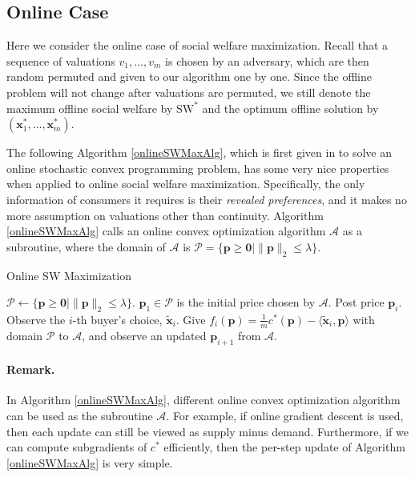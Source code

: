 \documentclass{article}
\begin{document}
\subsection{Online Case}\label{onlineSec}
Here we consider the online case of social welfare maximization. Recall that a sequence of valuations $v_1,\ldots,v_m$ is chosen by an adversary, which are then random permuted and given to our algorithm one by one. Since the offline problem will not change after valuations are permuted, we still denote the maximum offline social welfare by $\mathrm{SW}^*$ and the optimum offline solution by $(\mathbf{x}_1^*,\ldots,\mathbf{x}_m^*)$.

The following Algorithm \ref{onlineSWMaxAlg}, which is first given in \cite{AD15} to solve an online stochastic convex programming problem, has some very nice properties when applied to online social welfare maximization. Specifically, the only information of consumers it requires is their \emph{revealed preferences}, and it makes no more assumption on valuations other than continuity. Algorithm \ref{onlineSWMaxAlg} calls an online convex optimization algorithm $\mathcal{A}$ as a subroutine, where the domain of $\mathcal{A}$ is $\mathcal{P}=\{\mathbf{p}\ge \mathbf{0}|\|\mathbf{p}\|_2\le\lambda\}$.
\begin{algorithm}
    \caption{Online SW Maximization}
    \begin{algorithmic}
        \STATE $\mathcal{P}\leftarrow\{\mathbf{p}\ge \mathbf{0}|\|\mathbf{p}\|_2\le\lambda\}$.
        \STATE $\mathbf{p}_1\in \mathcal{P}$ is the initial price chosen by $\mathcal{A}$.
        \STATE Post price $\mathbf{p}_i$.
        \STATE Observe the $i$-th buyer's choice, $\tilde{\mathbf{x}}_i$.
        \STATE Give $f_i(\mathbf{p})=\frac{1}{m}c^*(\mathbf{p})-\langle\tilde{\mathbf{x}}_i,\mathbf{p}\rangle$ with domain $\mathcal{P}$ to $\mathcal{A}$, and observe an updated $\mathbf{p}_{i+1}$ from $\mathcal{A}$.
        \ENDFOR
    \end{algorithmic}
    \label{onlineSWMaxAlg}
\end{algorithm}

\paragraph{Remark.}
In Algorithm \ref{onlineSWMaxAlg}, different online convex optimization algorithm can be used as the subroutine $\mathcal{A}$. For example, if online gradient descent is used, then each update can still be viewed as supply minus demand. Furthermore, if we can compute subgradients of $c^*$ efficiently, then the per-step update of Algorithm \ref{onlineSWMaxAlg} is very simple.
\end{document}
